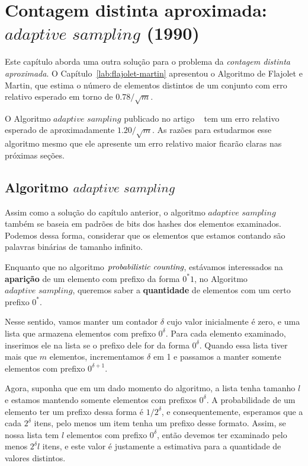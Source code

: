 \newcommand{\asampling}{\textit{adaptive sampling}}

\chapter{Contagem distinta aproximada: $\asampling$ (1990)}

Este capítulo aborda uma outra solução para o problema da \textit{contagem distinta aproximada}. O 
Capítulo~\ref{lab:flajolet-martin} apresentou o Algoritmo de Flajolet e Martin, que estima o número de elementos 
distintos de um conjunto com erro relativo esperado em torno de $0.78 / \sqrt{m}$. 

O Algoritmo $\asampling$ publicado no artigo ~\citep{adptive:sampling:90} tem um erro relativo esperado de 
aproximadamente $1.20 / \sqrt{m}$. As razões para estudarmos esse algoritmo mesmo que ele apresente um erro relativo 
maior ficarão claras nas próximas seções.

\section{Algoritmo $\asampling$}
\label{lab:chapter:04:01}

Assim como a solução do capítulo anterior, o algoritmo $\asampling$ também se baseia em padrões de bits dos hashes dos 
elementos examinados. Podemos dessa forma, considerar que os elementos que estamos contando são palavras binárias de 
tamanho infinito. 

Enquanto que no algoritmo $\textit{probabilistic counting}$, estávamos interessados na \textbf{aparição} de um elemento com 
prefixo da forma $0^*1$, no Algoritmo $\asampling$, queremos saber a \textbf{quantidade} de elementos com um certo 
prefixo $0^*$.

Nesse sentido, vamos manter um contador $\delta$ cujo valor inicialmente é zero, e uma lista que armazena elementos com 
prefixo $0^{\delta}$. Para cada elemento examinado, inserimos ele na lista se o prefixo dele for da forma $0^{\delta}$.
Quando essa lista tiver mais que $m$ elementos, incrementamos $\delta$ em 1 e passamos a manter 
somente elementos com prefixo $0^{\delta + 1}$.

Agora, suponha que em um dado momento do algoritmo, a lista tenha tamanho $l$ e estamos mantendo somente elementos com 
prefixos $0^{\delta}$. A probabilidade de um elemento ter um prefixo dessa forma é $1 / 2^{\delta}$, e consequentemente,
esperamos que a cada $2^{\delta}$ itens, pelo menos um item tenha um prefixo desse formato. Assim, se nossa lista tem
$l$ elementos com prefixo $0^{\delta}$, então devemos ter examinado pelo menos $2^{\delta} l$ itens, e este valor é 
justamente a estimativa para a quantidade de valores distintos.

